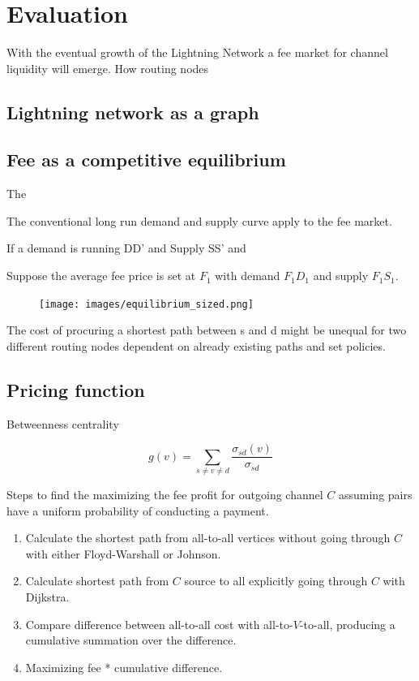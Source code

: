 \chapter{Evaluation}

With the eventual growth of the Lightning Network a fee market for channel liquidity will emerge. How routing nodes 

\section{Lightning network as a graph}




\section{Fee as a competitive equilibrium}

The

The conventional long run demand and supply curve apply to the fee market.

If a demand is running DD' and Supply SS' and

Suppose the average fee price is set at $F_{1}$ with demand $F_{1}D_{1}$ and supply $F_{1}S_{1}$.

\begin{figure}[!htb]
	\hspace*{-0.7cm} 
	\centering
	\texttt{[image: images/equilibrium\_sized.png]}
	\caption{ 
		}
		\label{fig:equilibrium}
		\hspace*{2mm} 	
\end{figure}



The cost of procuring a shortest path between s and d might be unequal for two different routing nodes dependent on already existing paths and set policies.

\section{Pricing function}

Betweenness centrality

\[ g(v) = \sum_{s \neq v \neq d}\frac{\sigma_{sd}(v)}{\sigma_{sd}} \]

Steps to find the maximizing the fee profit for outgoing channel $C$ assuming pairs have a uniform probability of conducting a payment.

\begin{enumerate}
	\item Calculate the shortest path from all-to-all vertices without going through $C$ with either Floyd-Warshall or Johnson. 
	\item Calculate shortest path from $C$ source to all explicitly going through $C$ with Dijkstra.
	\item Compare difference between all-to-all cost with all-to-$V$-to-all, producing a cumulative summation over the difference.
	\item Maximizing fee * cumulative difference.
\end{enumerate} 



